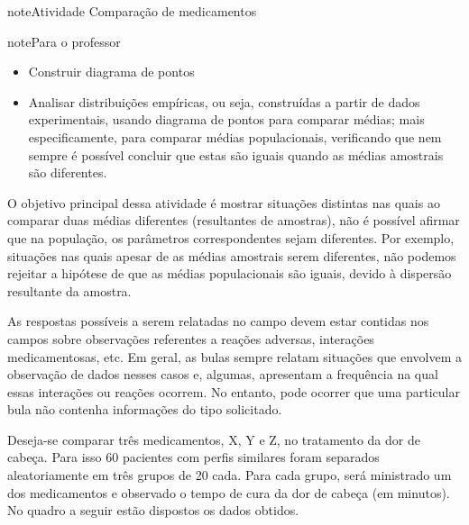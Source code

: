 \label{\detokenize{PE103-0:ativ-2-comparacao-de-medicamentos}}
\begin{sphinxadmonition}{note}{Atividade}{ Comparação de medicamentos}
\begin{sphinxadmonition}{note}{Para o professor}
\begin{itemize}
\item {} 
Construir diagrama de pontos

\item {} 
Analisar distribuições empíricas, ou seja, construídas a partir de dados experimentais, usando diagrama de pontos para comparar médias; mais especificamente, para comparar médias populacionais, verificando que nem sempre é possível concluir que estas são iguais quando as médias amostrais são diferentes.

\end{itemize}


O objetivo principal dessa atividade é mostrar situações distintas nas quais ao comparar duas médias diferentes (resultantes de amostras), não é possível afirmar que na população, os parâmetros correspondentes sejam diferentes. Por exemplo, situações nas quais apesar de as médias amostrais serem diferentes, não podemos rejeitar a hipótese de que as médias populacionais são iguais, devido à dispersão resultante da amostra.

As respostas possíveis a serem relatadas no campo  devem estar contidas nos campos sobre observações referentes a reações adversas, interações medicamentosas, etc. Em geral, as bulas sempre relatam situações que envolvem a observação de dados nesses casos e, algumas, apresentam a frequência na qual essas interações ou reações ocorrem. No entanto, pode ocorrer que uma particular bula não contenha informações do tipo solicitado.
\end{sphinxadmonition}


Deseja-se comparar três medicamentos, X, Y e Z, no tratamento da dor de cabeça. Para isso 60 pacientes com perfis similares foram separados aleatoriamente em três grupos de 20 cada. Para cada grupo,  será ministrado um dos medicamentos e observado o tempo de cura da dor de cabeça (em minutos). No quadro a seguir estão dispostos os dados obtidos.
\label{\detokenize{PE103-0:tabela-medicamentos}}


\end{sphinxadmonition}
